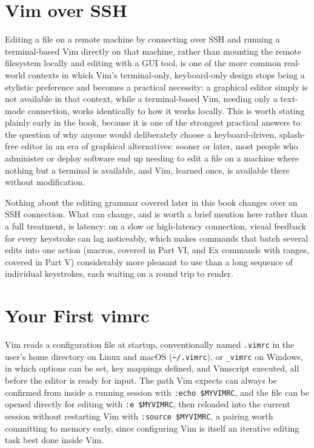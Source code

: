 \section{Vim over SSH}

Editing a file on a remote machine by connecting over SSH and running a terminal-based Vim directly on that machine, rather than mounting the remote filesystem locally and editing with a GUI tool, is one of the more common real-world contexts in which Vim's terminal-only, keyboard-only design stops being a stylistic preference and becomes a practical necessity: a graphical editor simply is not available in that context, while a terminal-based Vim, needing only a text-mode connection, works identically to how it works locally. This is worth stating plainly early in the book, because it is one of the strongest practical answers to the question of why anyone would deliberately choose a keyboard-driven, splash-free editor in an era of graphical alternatives: sooner or later, most people who administer or deploy software end up needing to edit a file on a machine where nothing but a terminal is available, and Vim, learned once, is available there without modification.

Nothing about the editing grammar covered later in this book changes over an SSH connection. What can change, and is worth a brief mention here rather than a full treatment, is latency: on a slow or high-latency connection, visual feedback for every keystroke can lag noticeably, which makes commands that batch several edits into one action (macros, covered in Part VI, and Ex commands with ranges, covered in Part V) considerably more pleasant to use than a long sequence of individual keystrokes, each waiting on a round trip to render.

\section{Your First vimrc}

Vim reads a configuration file at startup, conventionally named \texttt{.vimrc} in the user's home directory on Linux and macOS (\texttt{\textasciitilde/.vimrc}), or \texttt{\_vimrc} on Windows, in which options can be set, key mappings defined, and Vimscript executed, all before the editor is ready for input. The path Vim expects can always be confirmed from inside a running session with \texttt{:echo \$MYVIMRC}, and the file can be opened directly for editing with \texttt{:e \$MYVIMRC}, then reloaded into the current session without restarting Vim with \texttt{:source \$MYVIMRC}, a pairing worth committing to memory early, since configuring Vim is itself an iterative editing task best done inside Vim.

